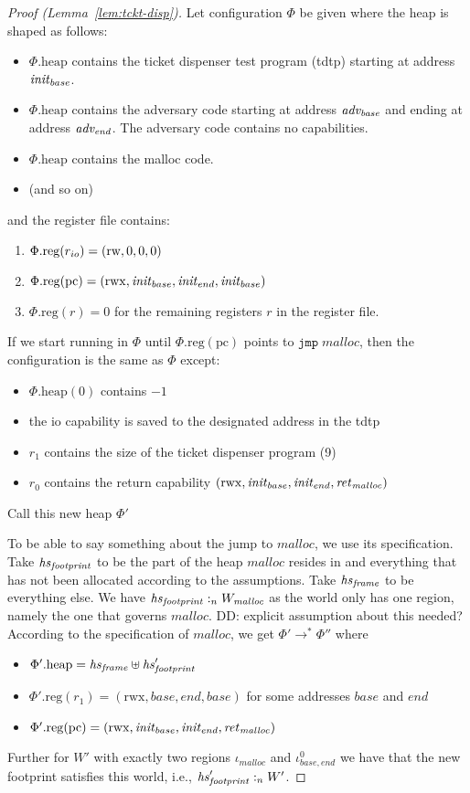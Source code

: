 \documentclass{article}
\newcommand\dominique[1]{{\color{purple} \sf \footnotesize {DD: #1}}}
\newcommand{\var}[1]{\mathit{#1}}
\newcommand{\pcreg}{\mathrm{pc}}
\newcommand{\heap}{\var{heap}}
\newcommand{\plainproj}[1]{\mathrm{#1}}
\newcommand{\memheap}[1][\Phi]{#1.\plainproj{heap}}
\newcommand{\memreg}[1][\Phi]{#1.\plainproj{reg}}
\newcommand{\heapSat}[3][\heap]{#1 :_{#2} #3}
\newcommand{\codelabel}[1]{\mathit{#1}}
\newcommand{\malloc}{\codelabel{malloc}}
\newcommand{\instr}[1]{\mathtt{#1}}
\newcommand{\oneinstr}[2]{\instr{#1} \; #2}
\newcommand{\jmp}[1]{\oneinstr{jmp}{#1}}
\newcommand{\plainperm}[1]{\mathrm{#1}}
\newcommand{\readwrite}{\plainperm{rw}}
\newcommand{\rwx}{\plainperm{rwx}}
\newcommand{\step}[1][]{\rightarrow_{#1}}
\begin{document}
 \begin{proof}[Proof (Lemma~\ref{lem:tckt-disp})]
Let configuration $\Phi$ be given where the heap is shaped as follows:
\begin{itemize}
\item $\memheap$ contains the ticket dispenser test program (tdtp) starting at address $\initb$.
\item $\memheap$ contains the adversary code starting at address $\advb$ and ending at address $\adve$. The adversary code contains no capabilities.
\item $\memheap$ contains the malloc code.
\item (and so on) %
\end{itemize}
and the register file contains:
\begin{enumerate}
\item $\memreg(\rio) = (\readwrite,0,0,0)$ 
\item $\memreg(\pcreg) = (\rwx,\initb, \inite, \initb)$
\item $\memreg(r) = 0$ for the remaining registers $r$ in the register file.
\end{enumerate}

If we start running in $\Phi$ until $\memreg(\pcreg)$ points to $\jmp{\malloc}$, then the configuration is the same as $\Phi$ except:
\begin{itemize}
\item $\memheap(0)$ contains $-1$
\item the io capability is saved to the designated address in the tdtp
\item $r_1$ contains the size of the ticket dispenser program (9)
\item $r_0$ contains the return capability $(\rwx,\initb,\inite, \retm)$
\end{itemize}
Call this new heap $\Phi'$

To be able to say something about the jump to $\malloc$, we use its specification. Take $\hsfoot$ to be the part of the heap $\malloc$ resides in and everything that has not been allocated according to the assumptions. Take $\hsframe$ to be everything else. We have $\heapSat[\hsfoot]{n}{W_\var{\malloc}}$ as the world only has one region, namely the one that governs $\malloc$.\dominique{explicit assumption about this needed?} According to the specification of $\malloc$, we get $\Phi' \step^* \Phi''$ where
\begin{itemize}
\item $\memheap[\Phi'] = \hsframe \uplus \hsfoot'$
\item $\memreg[\Phi'](r_1) = (\rwx,\var{base},\var{end},\var{base})$ for some addresses $\var{base}$ and $\var{end}$
\item $\memreg[\Phi'](\pcreg) = (\rwx,\initb,\inite,\retm)$
\end{itemize}
Further for $W'$ with exactly two regions $\iota_\malloc$ and $\iota_{\var{base},\var{end}}^0$ we have that the new footprint satisfies this world, i.e., $\heapSat[\hsfoot']{n}{W'}$.


\end{proof}
\end{document}
